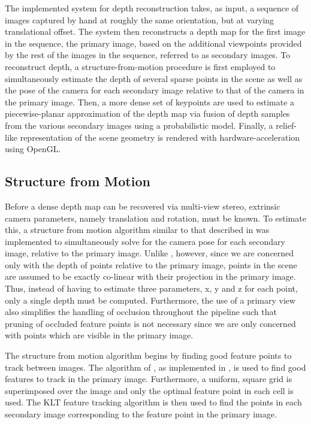 \documentclass[conference]{acmsiggraph}
\begin{document}
The implemented system for depth reconstruction takes, as input, a sequence
of images captured by hand at roughly the same orientation, but at varying
translational offset.  The system then reconstructs a depth map for the
first image in the sequence, the primary image, based on the additional
viewpoints provided by the rest of the images in the sequence,
referred to as secondary images.
To reconstruct depth, a structure-from-motion
procedure is first employed to simultaneously estimate the depth of several
sparse points in the scene as well as the pose of the camera
for each secondary image relative to that of the camera in the primary image.
Then, a more dense set of keypoints are used to 
estimate a piecewise-planar approximation of the depth map
via fusion of depth samples from the various secondary images using
a probabilistic model.
Finally, a relief-like representation of the scene geometry is rendered
with hardware-acceleration using OpenGL.

\subsection{Structure from Motion}

Before a dense depth map can be recovered via multi-view stereo,
extrinsic camera parameters, namely translation and rotation, must be known.
To estimate this, a structure from motion algorithm similar to that
described in \cite{snavely2006photo} was implemented to
simultaneously solve for the camera pose for each secondary image,
relative to the primary image.
Unlike \cite{snavely2006photo}, however, since we are concerned
only with the depth of points relative to the primary image,
points in the scene are assumed to be exactly co-linear with
their projection in the primary image.  Thus, instead of having
to estimate three parameters, x, y and z for each point,
only a single depth must be computed.  Furthermore, the use
of a primary view also simplifies the handling of occlusion throughout
the pipeline such that pruning of occluded feature points
is not necessary since we are only concerned with points which
are visible in the primary image.

The structure from motion algorithm begins by finding good feature points
to track between images.  The algorithm of \cite{shi1994good}, as implemented
in \cite{opencv_library}, is used to find good features to track in the
primary image.
Furthermore, a uniform, square grid is superimposed over the image and only
the optimal feature point in each cell is used.
The KLT feature tracking algorithm is then used to find the points in each
secondary image corresponding to the feature point in the primary image.
\end{document}
